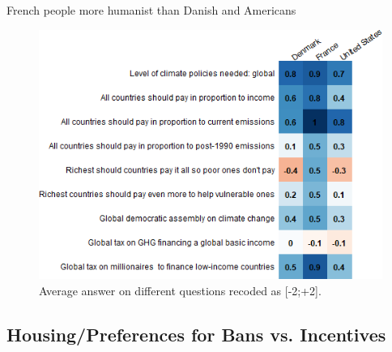 \begin{framefont}{\small}
\begin{frame}{French people more humanist than Danish and Americans}%
\begin{figure}[h!]
\centering
\caption{Average answer on different questions recoded as [-2;+2].}
\includegraphics[width=.7\paperwidth]{../figures/country_comparison/burden_sharing_main_mean_countries.png}
\end{figure}
\end{frame}

\subsection{Housing/Preferences for Bans vs. Incentives}


\end{framefont}
